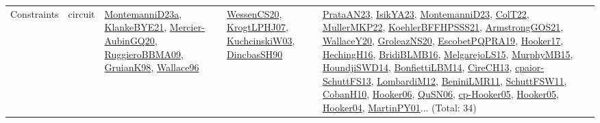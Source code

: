 {\begin{longtable}{lp{3cm}>{\raggedright}p{6cm}>{\raggedright}p{6cm}p{8cm}}
Constraints & circuit & \href{articles/MontemanniD23a.pdf}{MontemanniD23a}\cite{MontemanniD23a}, \href{papers/KlankeBYE21.pdf}{KlankeBYE21}\cite{KlankeBYE21}, \href{papers/Mercier-AubinGQ20.pdf}{Mercier-AubinGQ20}\cite{Mercier-AubinGQ20}, \href{articles/RuggieroBBMA09.pdf}{RuggieroBBMA09}\cite{RuggieroBBMA09}, \href{papers/GruianK98.pdf}{GruianK98}\cite{GruianK98}, \href{articles/Wallace96.pdf}{Wallace96}\cite{Wallace96} & \href{papers/WessenCS20.pdf}{WessenCS20}\cite{WessenCS20}, \href{papers/KrogtLPHJ07.pdf}{KrogtLPHJ07}\cite{KrogtLPHJ07}, \href{articles/KuchcinskiW03.pdf}{KuchcinskiW03}\cite{KuchcinskiW03}, \href{articles/DincbasSH90.pdf}{DincbasSH90}\cite{DincbasSH90} & \href{articles/PrataAN23.pdf}{PrataAN23}\cite{PrataAN23}, \href{articles/IsikYA23.pdf}{IsikYA23}\cite{IsikYA23}, \href{articles/MontemanniD23.pdf}{MontemanniD23}\cite{MontemanniD23}, \href{articles/ColT22.pdf}{ColT22}\cite{ColT22}, \href{articles/MullerMKP22.pdf}{MullerMKP22}\cite{MullerMKP22}, \href{articles/KoehlerBFFHPSSS21.pdf}{KoehlerBFFHPSSS21}\cite{KoehlerBFFHPSSS21}, \href{papers/ArmstrongGOS21.pdf}{ArmstrongGOS21}\cite{ArmstrongGOS21}, \href{articles/WallaceY20.pdf}{WallaceY20}\cite{WallaceY20}, \href{papers/GroleazNS20.pdf}{GroleazNS20}\cite{GroleazNS20}, \href{articles/EscobetPQPRA19.pdf}{EscobetPQPRA19}\cite{EscobetPQPRA19}, \href{papers/Hooker17.pdf}{Hooker17}\cite{Hooker17}, \href{papers/HechingH16.pdf}{HechingH16}\cite{HechingH16}, \href{articles/BridiBLMB16.pdf}{BridiBLMB16}\cite{BridiBLMB16}, \href{papers/MelgarejoLS15.pdf}{MelgarejoLS15}\cite{MelgarejoLS15}, \href{papers/MurphyMB15.pdf}{MurphyMB15}\cite{MurphyMB15}, \href{papers/HoundjiSWD14.pdf}{HoundjiSWD14}\cite{HoundjiSWD14}, \href{articles/BonfiettiLBM14.pdf}{BonfiettiLBM14}\cite{BonfiettiLBM14}, \href{papers/CireCH13.pdf}{CireCH13}\cite{CireCH13}, \href{papers/cpaior-SchuttFS13.pdf}{cpaior-SchuttFS13}\cite{cpaior-SchuttFS13}, \href{articles/LombardiM12.pdf}{LombardiM12}\cite{LombardiM12}, \href{articles/BeniniLMR11.pdf}{BeniniLMR11}\cite{BeniniLMR11}, \href{articles/SchuttFSW11.pdf}{SchuttFSW11}\cite{SchuttFSW11}, \href{papers/CobanH10.pdf}{CobanH10}\cite{CobanH10}, \href{articles/Hooker06.pdf}{Hooker06}\cite{Hooker06}, \href{papers/QuSN06.pdf}{QuSN06}\cite{QuSN06}, \href{papers/cp-Hooker05.pdf}{cp-Hooker05}\cite{cp-Hooker05}, \href{articles/Hooker05.pdf}{Hooker05}\cite{Hooker05}, \href{papers/Hooker04.pdf}{Hooker04}\cite{Hooker04}, \href{articles/MartinPY01.pdf}{MartinPY01}\cite{MartinPY01}... (Total: 34)\\

\end{longtable}}

